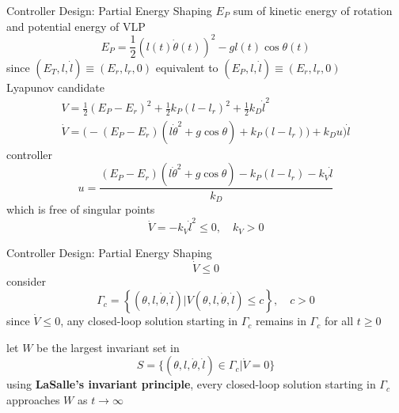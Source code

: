 \documentclass[10pt]{beamer}
\begin{document}
  \begin{frame}{Controller Design: Partial Energy Shaping}
    $E_P$ sum of kinetic energy of rotation and potential energy of VLP
    \begin{equation*}
      E_P = \frac{1}{2}(l(t)\dot{\theta}(t))^2-gl(t)\cos\theta(t)
    \end{equation*}
    since $(E_T, l, \dot{l}) \equiv (E_r, l_r, 0)$ equivalent to
    $(E_P, l, \dot{l}) \equiv (E_r, l_r, 0)$
    \\
    Lyapunov candidate
    \begin{gather*}
      V = \frac{1}{2}(E_P-E_r)^2+\frac{1}{2}k_P(l-l_r)^2+
        \frac{1}{2}k_D\dot{l}^2 \\ 
      \dot{V} = \big(-(E_P-E_r)(l\dot{\theta}^2+g\cos\theta)+k_P(l-l_r)\big)
        + k_D u) \dot{l}
    \end{gather*}
    controller
    \begin{equation*}
      u = \frac{(E_P-E_r)(l\dot{\theta}^2+g\cos\theta)-k_P(l-l_r)
        -k_V\dot{l}}{k_D}
    \end{equation*}
    which is free of singular points
    \begin{equation*}
      \dot{V} = -k_V \dot{l}^2 \le 0, \quad k_V > 0
    \end{equation*}
  \end{frame}

  \begin{frame}{Controller Design: Partial Energy Shaping}
    \begin{equation*}
      \dot{V} \leq 0
    \end{equation*}
    consider
    \begin{equation*}
      \Gamma_c = \left\{(\theta,l,\dot{\theta},\dot{l})|
        V(\theta,l,\dot{\theta},\dot{l}) \le c\right\}, \quad c > 0
    \end{equation*}
    since $\dot{V} \le 0$, any closed-loop solution starting in $\Gamma_c$
    remains in $\Gamma_c$ for all $t \ge 0$
    
    let $W$ be the largest invariant set in
    \begin{equation*}
      S = \{(\theta,l,\dot{\theta},\dot{l}) \in \Gamma_c|\dot{V}=0\}
    \end{equation*}
    using \textbf{LaSalle's invariant principle}, every closed-loop
    solution starting in $\Gamma_c$ approaches $W$ as $t \to \infty$
  \end{frame}
\end{document}
